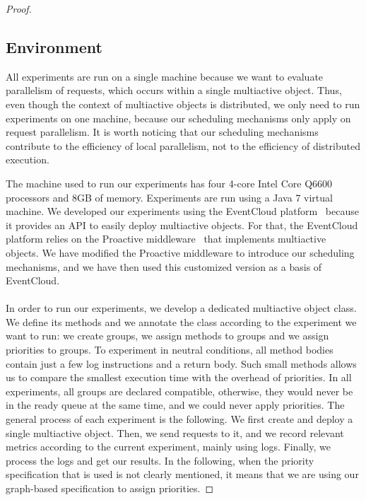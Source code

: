 \documentclass[11pt]{report}
\begin{document}
\begin{proof}
\subsection{Environment}
All experiments are run on a single machine because we want to evaluate parallelism of requests, which occurs within a single multiactive object. Thus, even though the context of multiactive objects is distributed, we only need to run experiments on one machine, because our scheduling mechanisms only apply on request parallelism. It is worth noticing that our scheduling mechanisms contribute to the efficiency of local parallelism, not to the efficiency of distributed execution.

The machine used to run our experiments has four 4-core Intel Core Q6600 processors and 8GB of memory. Experiments are run using a Java 7 virtual machine.
We developed our experiments using the EventCloud platform~\cite{ref:eventcloud} because it provides an API to easily deploy multiactive objects. For that, the EventCloud platform relies on the Proactive middleware~\cite{ref:proactive} that implements multiactive objects. We have modified the Proactive middleware to introduce our scheduling mechanisms, and we have then used this customized version as a basis of EventCloud.

\paragraph{}
In order to run our experiments, we develop a dedicated multiactive object class. We define its methods and we annotate the class according to the experiment we want to run: we create groups, we assign methods to groups and we assign priorities to groups. To experiment in neutral conditions, all method bodies contain just a few log instructions and a return body. Such small methods allows us to compare the smallest execution time with the overhead of priorities. 
In all experiments, all groups are declared compatible, otherwise, they would never be in the ready queue at the same time, and we could never apply priorities. The general process of each experiment is the following. We first create and deploy a single multiactive object. Then, we send requests to it, and we record relevant metrics according to the current experiment, mainly using logs. Finally, we process the logs and get our results.
In the following, when the priority specification that is used is not clearly mentioned, it means that we are using our graph-based specification to assign priorities.


\end{proof}
\end{document}

